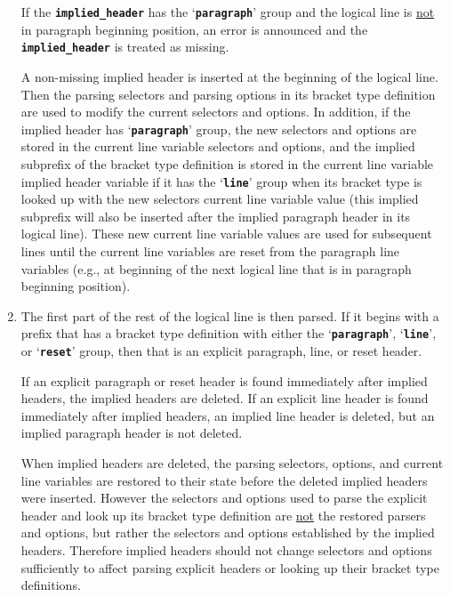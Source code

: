 \documentclass[12pt]{article}
\newcommand{\TT}[1]{{\tt \bfseries #1}}
\newcommand{\EOL}{\penalty \exhyphenpenalty}
\begin{document}
\begin{enumerate}
If the \TT{implied\_header} has the `\TT{paragraph}' group and the
logical line is \underline{not} in paragraph beginning position,
an error is announced and the \TT{implied\_\EOL header} is treated as missing.

A non-missing implied header is inserted at the beginning of the logical line.
Then the parsing selectors and parsing options
in its bracket type definition are used to
modify the current selectors and options.
In addition, if the implied header has `\TT{paragraph}' group,
the new selectors and options are stored in the current line
variable selectors and options, and
the implied subprefix of the bracket type definition is stored in
the current line variable implied header variable if it has the
`\TT{line}' group when its bracket type is looked up with the
new selectors current line variable value (this implied subprefix
will also be inserted after the implied paragraph header in its
logical line).
These new current line variable values are used for subsequent lines
until the current line variables are reset from the paragraph line
variables (e.g., at beginning of the next logical line that is
in paragraph beginning position).

\item\label{EXPLICIT-HEADER-PARSING}

The first part of the rest of the logical line is then parsed.
If it begins with a prefix that has a bracket type definition with either
the `\TT{paragraph}', `\TT{line}', or `\TT{reset}' group,
then that is an explicit paragraph, line, or reset header.

If an explicit paragraph or reset
header is found immediately after implied headers,
the implied headers are deleted.
If an explicit line header is found immediately after implied headers,
an implied line header is deleted, but an implied paragraph header is not
deleted.

When implied headers are deleted, the parsing selectors, options,
and current line variables are restored to their state before the deleted
implied headers were inserted.
However the selectors and options used to parse the
explicit header and look up its
bracket type definition are \underline{not} the restored parsers and options,
but rather the selectors and options established by the implied headers.
Therefore implied headers should not change selectors and options
sufficiently to affect parsing explicit headers or looking up their
bracket type definitions.


\end{enumerate}
\end{document}
